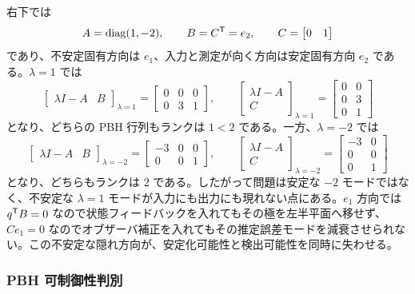 右下では
\begin{equation}
  A=\operatorname{diag}(1,-2),\qquad
  B=C^{\mathsf{T}}=e_2,\qquad C=\begin{bmatrix}0&1\end{bmatrix}
\end{equation}
であり、不安定固有方向は $e_1$、入力と測定が向く方向は安定固有方向 $e_2$ である。$\lambda=1$ では
\begin{equation}
  \begin{bmatrix}\lambda I-A&B\end{bmatrix}_{\lambda=1}
  =
  \begin{bmatrix}0&0&0\\0&3&1\end{bmatrix},\qquad
  \begin{bmatrix}\lambda I-A\\C\end{bmatrix}_{\lambda=1}
  =
  \begin{bmatrix}0&0\\0&3\\0&1\end{bmatrix}
\end{equation}
となり、どちらの PBH 行列もランクは $1<2$ である。一方、$\lambda=-2$ では
\begin{equation}
  \begin{bmatrix}\lambda I-A&B\end{bmatrix}_{\lambda=-2}
  =
  \begin{bmatrix}-3&0&0\\0&0&1\end{bmatrix},\qquad
  \begin{bmatrix}\lambda I-A\\C\end{bmatrix}_{\lambda=-2}
  =
  \begin{bmatrix}-3&0\\0&0\\0&1\end{bmatrix}
\end{equation}
となり、どちらもランクは $2$ である。したがって問題は安定な $-2$ モードではなく、不安定な $\lambda=1$ モードが入力にも出力にも現れない点にある。$e_1$ 方向では $q^{\mathsf{T}} B=0$ なので状態フィードバックを入れてもその極を左半平面へ移せず、$Ce_1=0$ なのでオブザーバ補正を入れてもその推定誤差モードを減衰させられない。この不安定な隠れ方向が、安定化可能性と検出可能性を同時に失わせる。

\subsubsection{PBH 可制御性判別}


